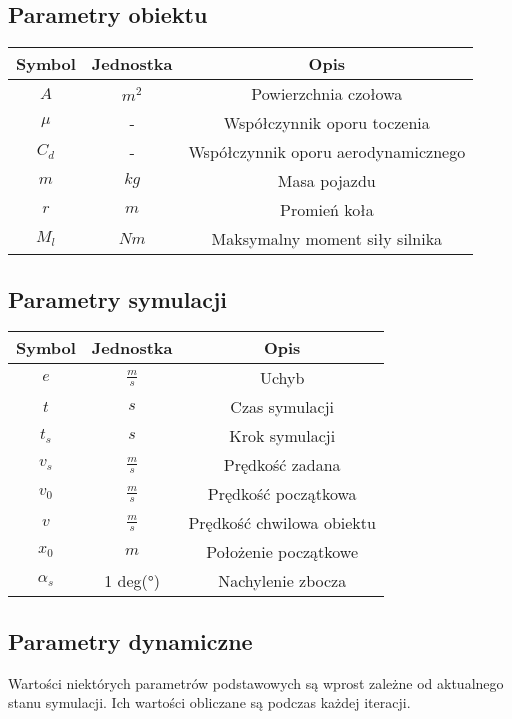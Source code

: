 \documentclass[12pt,a4paper]{article}
\begin{document}
	\subsection{Parametry obiektu}
	\begin{center}
		\begin{tabular}{|c|c|c|}
			\hline
			Symbol & Jednostka & Opis \\
			\hline
			\hline
			$A$ & $m^2$ & Powierzchnia czołowa \\
			\hline
			$\mu$ & - & Współczynnik oporu toczenia \\
			\hline
			$C_d$ & - & Współczynnik oporu aerodynamicznego \\
			\hline
			$m$ & $kg$ & Masa pojazdu \\
			\hline
			$r$ & $m$ & Promień koła \\
			\hline
			$M_l$ & $Nm$ & Maksymalny moment siły silnika \\
			\hline
		\end{tabular}
	\end{center}

	\subsection{Parametry symulacji}
	\begin{center}
		\begin{tabular}{|c|c|c|}
			\hline
			Symbol & Jednostka & Opis \\
			\hline
			\hline
			$e$ & $\frac{m}{s}$ & Uchyb \\
			\hline
			$t$ & $s$ & Czas symulacji \\
			\hline
			$t_s$ & $s$ & Krok symulacji \\
			\hline
			$v_s$ & $\frac{m}{s}$ & Prędkość zadana \\
			\hline
			$v_0$ & $\frac{m}{s}$ & Prędkość początkowa \\
			\hline
			$v$ & $\frac{m}{s}$ & Prędkość chwilowa obiektu \\
			\hline
			$x_0$ & $m$ & Położenie początkowe \\
			\hline
			$\alpha_s$ & 1 deg(°) & Nachylenie zbocza \\
			\hline
		\end{tabular}
	\end{center}
	
	\subsection{Parametry dynamiczne}
	Wartości niektórych parametrów podstawowych są wprost zależne od aktualnego stanu symulacji. Ich wartości obliczane są podczas każdej iteracji.
	
\end{document}
